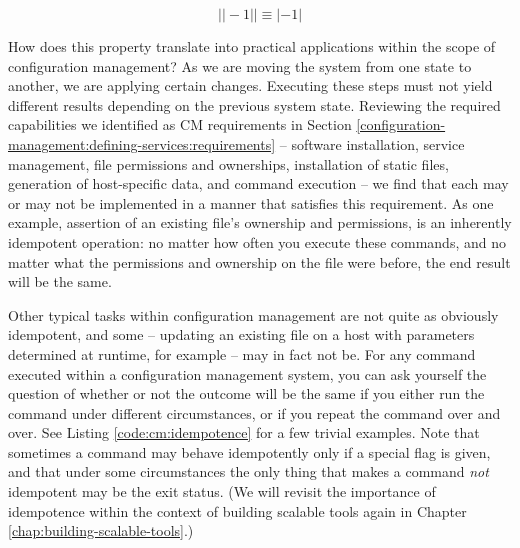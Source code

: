 \begin{displaymath}
| |-1| | \equiv |-1|
\end{displaymath}


How does this property translate into practical
applications within the scope of configuration
management?  As we are moving the system from one
state to another, we are applying certain changes.
Executing these steps must not yield different results
depending on the previous system state.  Reviewing the
required capabilities we identified as CM requirements
in Section
\ref{configuration-management:defining-services:requirements}
-- software installation, service management, file
permissions and ownerships, installation of static
files, generation of host-specific data, and command
execution -- we find that each may or may not be
implemented in a manner that satisfies this
requirement.  As one example, assertion of an existing
file's ownership and permissions, is an inherently
idempotent operation: no matter how often you execute
these commands, and no matter what the permissions and
ownership on the file were before, the end result will
be the same.

Other typical tasks within configuration management
are not quite as obviously idempotent, and some --
updating an existing file on a host with parameters
determined at runtime, for example -- may in fact
not be.  For any command executed within a
configuration management system, you can ask yourself
the question of whether or not the outcome will be the
same if you either run the command under different
circumstances, or if you repeat the command over and
over.  See Listing \ref{code:cm:idempotence} for a few
trivial examples.  Note that sometimes a command may
behave idempotently only if a special flag is given, and
that under some circumstances the only thing that
makes a command {\em not} idempotent may be the exit
status.  (We will revisit the importance of
idempotence within the context of building scalable
tools again in Chapter
\ref{chap:building-scalable-tools}.)

